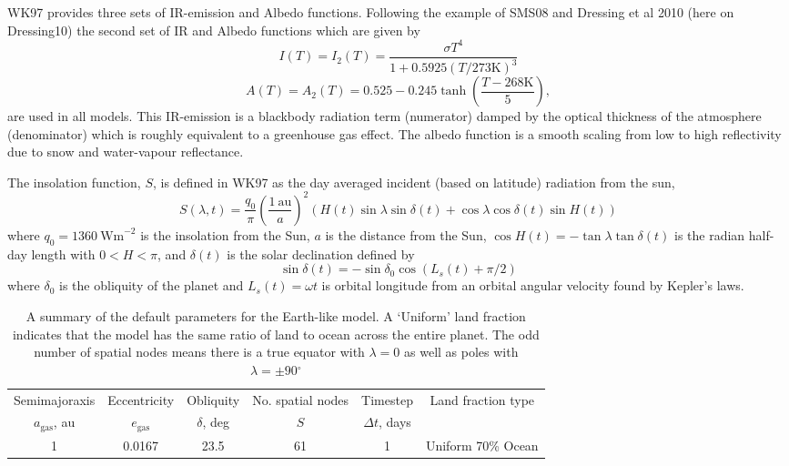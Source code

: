 \documentclass[12pt, onecolumn]{revtex4-2}    %
\newcommand{\degrees}{\ensuremath{^{\circ}}}
\begin{document}
WK97 provides three sets of IR-emission and Albedo functions. Following the example of SMS08 and Dressing et al 2010 (here on Dressing10) \cite{Dressing10} the second set of IR and Albedo functions which are given by
\begin{equation}
  I(T) = I_2(T) = \frac{\sigma T^4}{1 + 0.5925 (T / 273 \text{K}) ^ 3}
\end{equation}
\begin{equation}
  A(T) = A_2(T) = 0.525 - 0.245 \tanh\left(\frac{T - 268 \text{K}}{5}\right),
\end{equation}
are used in all models.
This IR-emission is a blackbody radiation term (numerator) damped by the optical thickness of the atmosphere (denominator) which is roughly equivalent to a greenhouse gas effect.
The albedo function is a smooth scaling from low to high reflectivity due to snow and water-vapour reflectance.

The insolation function, $S$, is defined in WK97 as the day averaged incident (based on latitude) radiation from the sun,
$$
  S(\lambda, t) = \frac{q_0}{\pi} \left(\frac{1 \ \text{au}}{a}\right)^2 (H(t) \sin{\lambda} \sin{\delta(t)} + \cos{\lambda} \cos{\delta(t)} \sin{H(t)})
$$
where $q_0=1360 \ \text{Wm}^{-2}$ is the insolation from the Sun,
$a$ is the distance from the Sun,
$\cos H(t) = -\tan \lambda \tan \delta(t)$ is the radian half-day length with $0 < H < \pi$,
and $\delta(t)$ is the solar declination defined by
$$
  \sin \delta(t) = -\sin \delta_0 \cos(L_s(t) + \pi/2)
$$
where $\delta_0$ is the obliquity of the planet and $L_s(t) = \omega t$ is orbital longitude from an orbital angular velocity found by Kepler's laws.

\begin{table*}
  \begin{tabular}{|c|c|c|c|c|c|}
    \hline
    Semimajoraxis        & Eccentricity     & Obliquity     & No. spatial nodes & Timestep         & \multirow{2}{*}{Land fraction type} \\
    $a_{\text{gas}}$, au & $e_{\text{gas}}$ & $\delta$, deg & $S$               & $\Delta t$, days &                                     \\
    \hline
    1                    & 0.0167           & 23.5          & 61                & 1                & Uniform 70\% Ocean                  \\
    \hline
  \end{tabular}
  \caption{A summary of the default parameters for the Earth-like model.
    A `Uniform' land fraction indicates that the model has the same ratio of land to ocean across the entire planet.
    The odd number of spatial nodes means there is a true equator with $\lambda = 0$ as well as poles with $\lambda = \pm 90\degrees$}
  \label{tab:default_params}
\end{table*}
\end{document}
